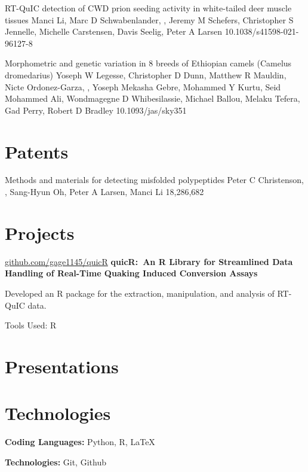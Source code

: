 \documentclass{resume}
\begin{document}
\begin{samepage}
            {RT-QuIC detection of CWD prion seeding activity in white-tailed deer muscle tissues}
            {Manci Li, Marc D Schwabenlander, \me{}, Jeremy M Schefers, Christopher S Jennelle, Michelle Carstensen, Davis Seelig, Peter A Larsen}
            {10.1038/s41598-021-96127-8}

            {Morphometric and genetic variation in 8 breeds of Ethiopian camels (Camelus dromedarius)}
            {Yoseph W Legesse, Christopher D Dunn, Matthew R Mauldin, Nicte Ordonez-Garza, \me{}, Yoseph Mekasha Gebre, Mohammed Y Kurtu, Seid Mohammed Ali, Wondmagegne D Whibesilassie, Michael Ballou, Melaku Tefera, Gad Perry, Robert D Bradley}
            {10.1093/jas/sky351}

        \end{samepage}


    \section{Patents}
        \begin{samepage}
            {Methods and materials for detecting misfolded polypeptides}
            {Peter C Christenson, \me{}, Sang-Hyun Oh, Peter A Larsen, Manci Li}
            {18,286,682}
        \end{samepage}
    

    \section{Projects}
        \begin{twocolentry}{\href{https://github.com/gage1145/quicR}{github.com/gage1145/quicR}}
            \textbf{quicR:\ An R Library for Streamlined Data Handling of Real-Time Quaking Induced Conversion Assays}
        \end{twocolentry}

        \vspace{0.10 cm}
        \begin{onecolentry}
            \begin{highlights}
                \item Developed an R package for the extraction, manipulation, and analysis of RT-QuIC data.
                \item Tools Used: R
            \end{highlights}
        \end{onecolentry}

    \section{Presentations}

    \section{Technologies}
        \begin{onecolentry}
            \textbf{Coding Languages:} Python, R, \LaTeX{}
        \end{onecolentry}

        \vspace{0.2 cm}

        \begin{onecolentry}
            \textbf{Technologies:} Git, Github
        \end{onecolentry}
\end{document}
